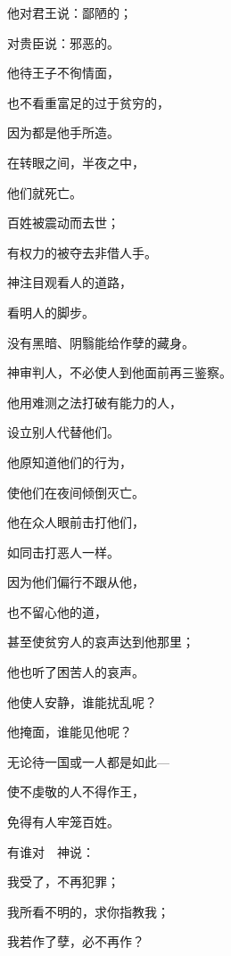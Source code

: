 {\par }{\Q {}他对君王说：{}鄙陋的；
\par }{\Q 对贵臣说：{}邪恶的。
\par }{\Q {}他待王子不徇情面，
\par }{\Q 也不看重富足的过于贫穷的，
\par }{\Q 因为都是他手所造。
\par }{\Q {}在转眼之间，半夜之中，
\par }{\Q 他们就死亡。
\par }{\Q 百姓被震动而去世；
\par }{\Q 有权力的被夺去非借人手。
\par }{\BB \par }{\Q {}神注目观看人的道路，
\par }{\Q 看明人的脚步。
\par }{\Q {}没有黑暗、阴翳能给作孽的藏身。
\par }{\Q {}神审判人，不必使人到他面前再三鉴察。
\par }{\Q {}他用难测之法打破有能力的人，
\par }{\Q 设立别人代替他们。
\par }{\Q {}他原知道他们的行为，
\par }{\Q 使他们在夜间倾倒灭亡。
\par }{\Q {}他在众人眼前击打他们，
\par }{\Q 如同击打恶人一样。
\par }{\Q {}因为他们偏行不跟从他，
\par }{\Q 也不留心他的道，
\par }{\Q {}甚至使贫穷人的哀声达到他那里；
\par }{\Q 他也听了困苦人的哀声。
\par }{\BB \par }{\Q {}他使人安静，谁能扰乱呢？
\par }{\Q 他掩面，谁能见他呢？
\par }{\Q 无论待一国或一人都是如此—
\par }{\Q {}使不虔敬的人不得作王，
\par }{\Q 免得有人牢笼百姓。
\par }{\BB \par }{\Q {}有谁对　神说：
\par }{\Q 我受了{}，不再犯罪；
\par }{\Q {}我所看不明的，求你指教我；
\par }{\Q 我若作了孽，必不再作？
}
